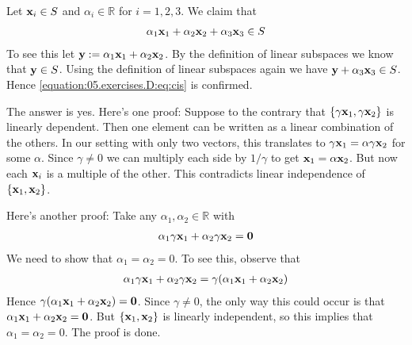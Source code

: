 \documentclass[letterpaper,10pt,english]{jupyterBook}
\begin{document}
\sphinxAtStartPar
{}

\sphinxAtStartPar
Let \({\bf x}_i \in S\) and \(\alpha_i \in \mathbb{R}\) for \(i=1,2,3\). We claim that
\begin{equation}\label{equation:05.exercises.D:eq:cis}
\begin{split}
\alpha_1 {\bf x}_1 +
\alpha_2 {\bf x}_2 +
\alpha_3 {\bf x}_3 
\in S
\end{split}
\end{equation}
\sphinxAtStartPar
To see this let \({\bf y} := \alpha_1 {\bf x}_1 + \alpha_2 {\bf x}_2\). By the
definition of linear subspaces we know that \({\bf y} \in S\).
Using the definition of linear subspaces again we have \({\bf y} + \alpha_3
{\bf x}_3 \in S\). Hence \eqref{equation:05.exercises.D:eq:cis} is confirmed.

\sphinxAtStartPar
{}

\sphinxAtStartPar
The answer is yes. Here’s one proof: Suppose to the contrary that
\(\{\gamma {\bf x}_1, \gamma {\bf x}_2\}\) is linearly dependent. Then one
element can be written as a linear combination of the others. In our
setting with only two vectors, this translates to \(\gamma {\bf x}_1 =
\alpha \gamma {\bf x}_2\) for some \(\alpha\). Since \(\gamma \ne 0\) we can
multiply each side by \(1/\gamma\) to get \({\bf x}_1 = \alpha {\bf x}_2\). But
now each \({\bf x}_i\) is a multiple of the other. This contradicts linear
independence of \(\{{\bf x}_1, {\bf x}_2\}\).

\sphinxAtStartPar
Here’s another proof: Take any \(\alpha_1, \alpha_2 \in \mathbb{R}\) with
\begin{equation}\label{equation:05.exercises.D:eq:lio}
\begin{split}
\alpha_1 \gamma {\bf x}_1 + \alpha_2 \gamma {\bf x}_2 = {\bf 0}
\end{split}
\end{equation}
\sphinxAtStartPar
We need to show that \(\alpha_1 = \alpha_2 = 0\). To see this, observe that
\begin{equation*}
\begin{split}
\alpha_1 \gamma {\bf x}_1 + \alpha_2 \gamma {\bf x}_2 
= \gamma (\alpha_1 {\bf x}_1 + \alpha_2 {\bf x}_2)
\end{split}
\end{equation*}
\sphinxAtStartPar
Hence \(\gamma (\alpha_1 {\bf x}_1 + \alpha_2 {\bf x}_2) = {\bf 0}\).
Since \(\gamma \ne 0\), the only way this could occur is that
\( \alpha_1 {\bf x}_1 + \alpha_2 {\bf x}_2 = {\bf 0}\).
But \(\{{\bf x}_1, {\bf x}_2\}\) is linearly independent, so this implies
that \(\alpha_1 = \alpha_2 = 0\). The proof is done.
\end{document}
